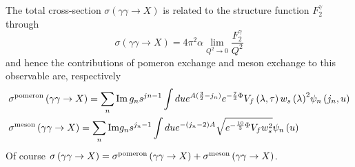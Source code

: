 \documentclass[a4paper,12pt]{article}
\begin{document}
The total cross-section $\sigma\left(\gamma \gamma \rightarrow X\right)$ is related to the structure function $F^\gamma_2$ through
\begin{equation}
\sigma\left(\gamma \gamma \rightarrow X\right) =  4 \pi^2 \alpha \lim_{Q^2 \rightarrow 0} \frac{F_2^\gamma}{Q^2}
\end{equation}
and hence the contributions of pomeron exchange and meson exchange to this observable are, respectively
\begin{align}
&\sigma^{\rm pomeron}\left(\gamma \gamma \rightarrow X\right) =  \sum_n {\rm Im} \, g_n s^{jn-1} \int du e^{A(\frac{3}{2} - j_n)}  e^{-\frac{7}{3} \Phi}  V_f \left( \lambda, \tau \right) {w_s\left(\lambda \right)}^2  \psi_n \left(j_n, u\right) \\ 
&\sigma^{\rm meson}\left(\gamma \gamma \rightarrow X\right) = \sum_n {\rm Im} g_n s^{j_n - 1} \int du e^{-\left(j_n - 2 \right)A }\sqrt{e^{-\frac{10}{3} \Phi} V_f w_s^2}  \psi_n\left(u\right)
\end{align}
Of course $\sigma\left(\gamma \gamma \rightarrow X\right) = \sigma^{\rm pomeron}\left(\gamma \gamma \rightarrow X\right) + \sigma^{\rm meson}\left(\gamma \gamma \rightarrow X\right)$.






















































\end{document}
